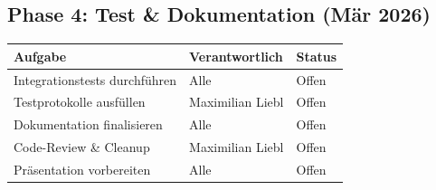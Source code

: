 \documentclass[a4paper,11pt]{article}
\begin{document}
\subsection{Phase 4: Test \& Dokumentation (Mär 2026)}

\begin{longtable}{p{6.5cm} p{3.5cm} p{2.5cm}}
\toprule
\rowcolor{tableheader}
\textbf{Aufgabe} & \textbf{Verantwortlich} & \textbf{Status} \\
\midrule
\endhead
Integrationstests durchführen               & Alle               & \textcolor{statusopen}{Offen} \\
Testprotokolle ausfüllen                    & Maximilian Liebl   & \textcolor{statusopen}{Offen} \\
Dokumentation finalisieren                  & Alle               & \textcolor{statusopen}{Offen} \\
Code-Review \& Cleanup                      & Maximilian Liebl   & \textcolor{statusopen}{Offen} \\
Präsentation vorbereiten                    & Alle               & \textcolor{statusopen}{Offen} \\
\bottomrule
\end{longtable}
\end{document}

